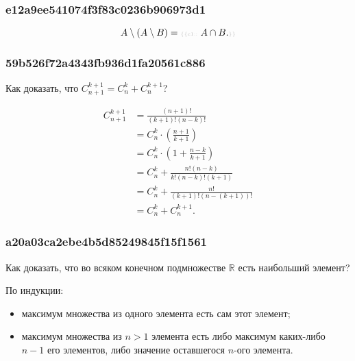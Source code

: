 \documentclass[11pt, a5paper]{article}
\newenvironment{note}[1]{\goodbreak\par\subsubsection{\hfill \color{lightgray}\tiny #1}}{}
\newenvironment{cloze}[2][\ldots]{\begin{leftbar}}{\end{leftbar}}
\newenvironment{icloze}[2][\ldots]{%
  \ignorespaces\text{\tiny \color{lightgray} \{\{c#2:: }%
}{%
  \text{\tiny \color{lightgray}\}\}}\unskip%
}
\begin{document}
    \begin{note}{e12a9ee541074f3f83c0236b906973d1}
        \[
            A \setminus (A \setminus B) = \begin{icloze}{1}A \cap B.\end{icloze}
        \]
    \end{note}

    \begin{note}{59b526f72a4343fb936d1fa20561c886}
        Как доказать, что \; \( C_{n + 1}^{k + 1} = C_n^k + C_n^{k + 1} \)?
        \begin{cloze}{1}
            \begin{align*}
                C_{n + 1}^{k + 1} &= \frac{(n + 1)!}{(k + 1)!(n - k)!} \\
                &= C_n^k \cdot \left( \frac{n + 1}{k + 1}  \right) \\
                &= C_n^k \cdot \left( 1 + \frac{n - k}{k + 1}  \right) \\
                &= C_n^k + \frac{n! (n - k)}{k!(n - k)!(k + 1)} \\
                &= C_n^k + \frac{n!}{(k + 1)!(n - (k + 1))!} \\
                &= C_n^k + C_n^{k + 1}.
            \end{align*}
        \end{cloze}
    \end{note}

    \begin{note}{a20a03ca2ebe4b5d85249845f15f1561}
        Как доказать, что во всяком конечном подмножестве \(\mathbb{R}\) есть
        наибольший элемент?

        \begin{cloze}{1}
            По индукции:
            \begin{itemize}
                \item максимум множества из одного элемента есть сам этот
                    элемент;
                \item максимум множества из \( n > 1 \) элемента есть либо
                    максимум каких-либо \( n - 1 \) его элементов, либо значение
                    оставшегося \( n \)-ого элемента.
            \end{itemize}
        \end{cloze}
    \end{note}
\end{document}
